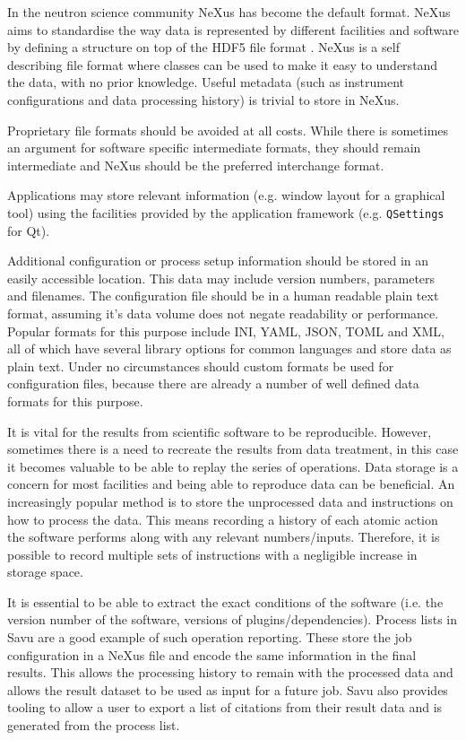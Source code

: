 \documentclass[jnr]{iosart2x}
\begin{document}
In the neutron science community NeXus \cite{K_nnecke_2015} has become the default format.
NeXus aims to standardise the way data is represented by different facilities and software by defining a structure on top of the HDF5 file format \cite{HDF5}.
NeXus is a self describing file format where classes can be used to make it easy to understand the data, with no prior knowledge.
Useful metadata (such as instrument configurations and data processing history) is trivial to store in NeXus.

Proprietary file formats should be avoided at all costs.
While there is sometimes an argument for software specific intermediate formats, they should remain intermediate and NeXus should be the preferred interchange format.

Applications may store relevant information (e.g. window layout for a graphical tool) using the facilities provided by the application framework (e.g. \texttt{QSettings} for Qt).

Additional configuration or process setup information should be stored in an easily accessible location.
This data may include version numbers, parameters and filenames.
The configuration file should be in a human readable plain text format, assuming it's data volume does not negate readability or performance.
Popular formats for this purpose include INI, YAML, JSON, TOML and XML, all of which have several library options for common languages and store data as plain text.
Under no circumstances should custom formats be used for configuration files, because there are already a number of well defined data formats for this purpose.

It is vital for the results from scientific software to be reproducible.
However, sometimes there is a need to recreate the results from data treatment, in this case it becomes valuable to be able to replay the series of operations.
Data storage is a concern for most facilities and being able to reproduce data can be beneficial.
An increasingly popular method is to store the unprocessed data and instructions on how to process the data.
This means recording a history of each atomic action the software performs along with any relevant numbers/inputs.
Therefore, it is possible to record multiple sets of instructions with a negligible increase in storage space.

It is essential to be able to extract the exact conditions of the software (i.e. the version number of the software, versions of plugins/dependencies).
Process lists in Savu \cite{Wadeson_2016} are a good example of such operation reporting.
These store the job configuration in a NeXus file and encode the same information in the final results.
This allows the processing history to remain with the processed data and allows the result dataset to be used as input for a future job.
Savu also provides tooling to allow a user to export a list of citations from their result data and is generated from the process list.
\end{document}

